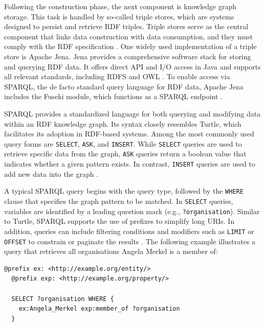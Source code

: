 \documentclass[a4paper,oneside,bibliography=totoc]{scrbook}
\begin{document}
Following the construction phase, the next component is knowledge graph storage. This task is handled by so-called triple stores, which are systems designed to persist and retrieve RDF triples. Triple stores serve as the central component that links data construction with data consumption, and they must comply with the \ac{RDF} specification \cite{Rusher2003}. One widely used implementation of a triple store is Apache Jena. Jena provides a comprehensive software stack for storing and querying RDF data. It offers direct API and I/O access in Java and supports all relevant standards, including \ac{RDFS} and \ac{OWL} \cite{Carroll2004}. To enable access via \ac{SPARQL}, the de facto standard query language for RDF data, Apache Jena includes the Fuseki module, which functions as a \ac{SPARQL} endpoint \cite{Chokshi2022}.

\ac{SPARQL} provides a standardized language for both querying and modifying data within an RDF knowledge graph. Its syntax closely resembles Turtle, which facilitates its adoption in RDF-based systems. Among the most commonly used query forms are \texttt{SELECT}, \texttt{ASK}, and \texttt{INSERT}. While \texttt{SELECT} queries are used to retrieve specific data from the graph, \texttt{ASK} queries return a boolean value that indicates whether a given pattern exists. In contrast, \texttt{INSERT} queries are used to add new data into the graph \cite{VillazonTerrazas2017}.

A typical \ac{SPARQL} query begins with the query type, followed by the \texttt{WHERE} clause that specifies the graph pattern to be matched. In \texttt{SELECT} queries, variables are identified by a leading question mark (e.g., \texttt{?organisation}). Similar to Turtle, \ac{SPARQL} supports the use of prefixes to simplify long \acp{URI}. In addition, queries can include filtering conditions and modifiers such as \texttt{LIMIT} or \texttt{OFFSET} to constrain or paginate the results \cite{VillazonTerrazas2017}. The following example illustrates a query that retrieves all organisations Angela Merkel is a member of:

\pagebreak

\begin{lstlisting}[language=SPARQL, caption=Example of a \ac{SPARQL} Query, label=lst:turtle_example]
  @prefix ex: <http://example.org/entity/>
  @prefix exp: <http://example.org/property/>
  
  SELECT ?organisation WHERE {
    ex:Angela_Merkel exp:member_of ?organisation
  }
\end{lstlisting}
\end{document}
